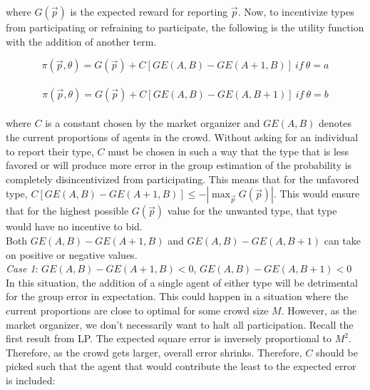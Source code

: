 \documentclass[twoside,twocolumn]{article}
\begin{document}
where $G(\vec{p})$ is the expected reward for reporting $\vec{p}$. Now, to incentivize types from participating or refraining to participate, the following is the utility function with the addition of another term.

\begin{equation}
\label{strictutil1}
\pi(\vec{p}, \theta) = G(\vec{p}) + C[GE(A,B) - GE(A+1,B)] \ if \ \theta=a
\end{equation}\\

\begin{equation}
\label{strictutil2}
\pi(\vec{p}, \theta) = G(\vec{p}) + C[GE(A,B) - GE(A,B+1)] \ if \ \theta=b
\end{equation}\\

where $C$ is a constant chosen by the market organizer and $GE(A,B)$ denotes the current proportions of agents in the crowd. Without asking for an individual to report their type, $C$ must be chosen in such a way that the type that is less favored or will produce more error in the group estimation of the probability is completely disincentivized from participating. This means that for the unfavored type, $C[GE(A,B) - GE(A+1,B)] \leq -|\max_{\vec{p}}G(\vec{p})|$. This would ensure that for the highest possible $G(\vec{p})$ value for the unwanted type, that type would have no incentive to bid.\\

Both $GE(A,B) - GE(A+1,B)$ and $GE(A,B) - GE(A,B+1)$ can take on positive or negative values. \\

\textit{Case 1}: $GE(A,B) - GE(A+1,B) < 0$, $GE(A,B) - GE(A,B+1) < 0$\\

In this situation, the addition of a single agent of either type will be detrimental for the group error in expectation. This could happen in a situation where the current proportions are close to optimal for some crowd size $M$. However, as the market organizer, we don't necessarily want to halt all participation. Recall the first result from LP. The expected square error is inversely proportional to $M^2$. Therefore, as the crowd gets larger, overall error shrinks. Therefore, $C$ should be picked such that the agent that would contribute the least to the expected error is included:\\

\\
\end{document}
